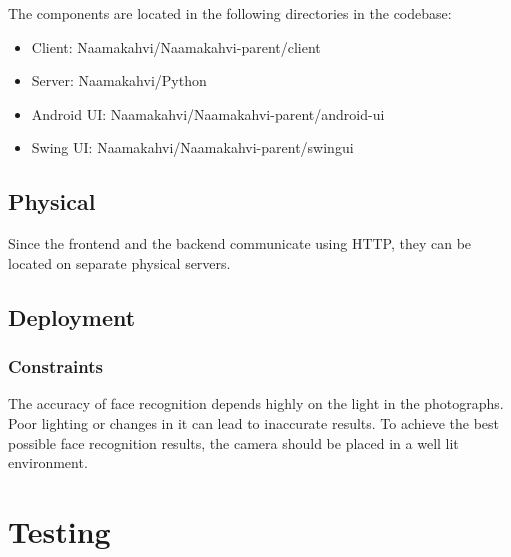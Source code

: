 \documentclass[11pt]{article}
\begin{document}
The components are located in the following directories in the codebase:
\begin{itemize}
\item Client: Naamakahvi/Naamakahvi-parent/client

\item Server: Naamakahvi/Python

\item Android UI: Naamakahvi/Naamakahvi-parent/android-ui

\item Swing UI: Naamakahvi/Naamakahvi-parent/swingui
\end{itemize}


\subsection{Physical}

Since the frontend and the backend communicate using HTTP, they can be
located on separate physical servers. %

\subsection{Deployment}

\subsubsection{Constraints}
The accuracy of face recognition depends highly on the light in the 
photographs. Poor lighting or changes in it can lead to inaccurate results.
To achieve the best possible face recognition results, the camera should be 
placed in a well lit environment.

\section{Testing}
\end{document}
